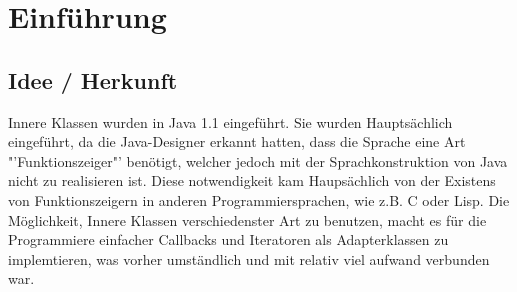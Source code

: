 \chapter{Einführung}
\section{Idee / Herkunft}

Innere Klassen wurden in Java 1.1 eingeführt. \cite{Oracle:JDK_Doku1.1.4}
Sie wurden Hauptsächlich eingeführt, da die Java-Designer erkannt hatten, dass die Sprache eine Art "'Funktionszeiger"' benötigt, welcher jedoch mit der Sprachkonstruktion von Java nicht zu realisieren ist.
Diese notwendigkeit kam Haupsächlich von der Existens von Funktionszeigern in anderen Programmiersprachen, wie z.B. C oder Lisp.
Die Möglichkeit, Innere Klassen verschiedenster Art zu benutzen, macht es für die Programmiere einfacher Callbacks und Iteratoren als Adapterklassen zu implemtieren, was vorher umständlich und mit relativ viel aufwand verbunden war.


\clearpage
